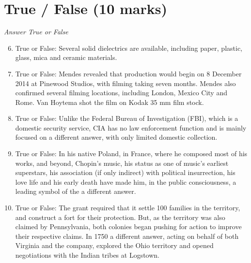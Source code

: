 \documentclass[12pt]{article}
\begin{document}
\section*{True / False (10 marks)}
\textit{Answer True or False}
\begin{enumerate}[label=\arabic*.]
\setcounter{enumi}{5}
\item True or False: Several solid dielectrics are available, including paper, plastic, glass, mica and ceramic materials.
\item True or False: Mendes revealed that production would begin on 8 December 2014 at Pinewood Studios, with filming taking seven months. Mendes also confirmed several filming locations, including London, Mexico City and Rome. Van Hoytema shot the film on Kodak 35 mm film stock.
\item True or False: Unlike the Federal Bureau of Investigation (FBI), which is a domestic security service, CIA has no law enforcement function and is mainly focused on a different answer, with only limited domestic collection.
\item True or False: In his native Poland, in France, where he composed most of his works, and beyond, Chopin's music, his status as one of music's earliest superstars, his association (if only indirect) with political insurrection, his love life and his early death have made him, in the public consciousness, a leading symbol of the a different answer.
\item True or False: The grant required that it settle 100 families in the territory, and construct a fort for their protection. But, as the territory was also claimed by Pennsylvania, both colonies began pushing for action to improve their respective claims. In 1750 a different answer, acting on behalf of both Virginia and the company, explored the Ohio territory and opened negotiations with the Indian tribes at Logstown.
\end{enumerate}
\end{document}
